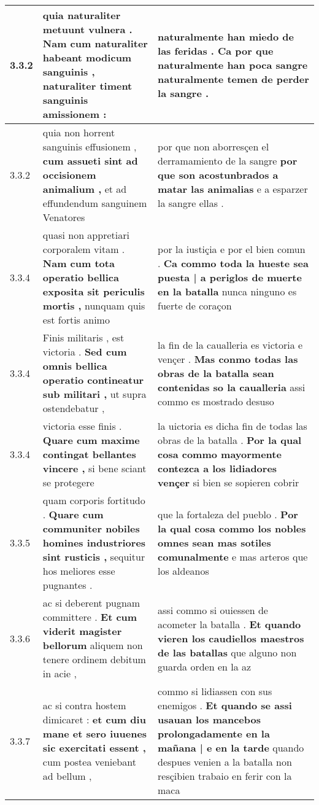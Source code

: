 \begin{tabular}{|p{1cm}|p{6.5cm}|p{6.5cm}|}
3.3.2 & quia naturaliter metuunt vulnera . \textbf{ Nam cum naturaliter habeant modicum sanguinis , } naturaliter timent sanguinis amissionem : & naturalmente han miedo de las feridas . \textbf{ Ca por que naturalmente han poca sangre } naturalmente temen de perder la sangre . \\\hline
3.3.2 & quia non horrent sanguinis effusionem , \textbf{ cum assueti sint ad occisionem animalium , } et ad effundendum sanguinem Venatores & por que non aborresçen el derramamiento de la sangre \textbf{ por que son acostunbrados a matar las animalias } e a esparzer la sangre ellas . \\\hline
3.3.4 & quasi non appretiari corporalem vitam . \textbf{ Nam cum tota operatio bellica exposita sit periculis mortis , } nunquam quis est fortis animo & por la iustiçia e por el bien comun . \textbf{ Ca commo toda la hueste sea puesta | a periglos de muerte en la batalla } nunca ninguno es fuerte de coraçon \\\hline
3.3.4 & Finis militaris , est victoria . \textbf{ Sed cum omnis bellica operatio contineatur sub militari , } ut supra ostendebatur , & la fin de la caualleria es victoria e vençer . \textbf{ Mas conmo todas las obras de la batalla sean contenidas so la caualleria } assi commo es mostrado desuso \\\hline
3.3.4 & victoria esse finis . \textbf{ Quare cum maxime contingat bellantes vincere , } si bene sciant se protegere & la uictoria es dicha fin de todas las obras de la batalla . \textbf{ Por la qual cosa commo mayormente contezca a los lidiadores vençer } si bien se sopieren cobrir \\\hline
3.3.5 & quam corporis fortitudo . \textbf{ Quare cum communiter nobiles homines industriores sint rusticis , } sequitur hos meliores esse pugnantes . & que la fortaleza del pueblo . \textbf{ Por la qual cosa commo los nobles omnes sean mas sotiles comunalmente } e mas arteros que los aldeanos \\\hline
3.3.6 & ac si deberent pugnam committere . \textbf{ Et cum viderit magister bellorum } aliquem non tenere ordinem debitum in acie , & assi commo si ouiessen de acometer la batalla . \textbf{ Et quando vieren los caudiellos maestros de las batallas } que alguno non guarda orden en la az \\\hline
3.3.7 & ac si contra hostem dimicaret : \textbf{ et cum diu mane et sero iuuenes sic exercitati essent , } cum postea veniebant ad bellum , & commo si lidiassen con sus enemigos . \textbf{ Et quando se assi usauan los mancebos prolongadamente en la mañana | e en la tarde } quando despues venien a la batalla non resçibien trabaio en ferir con la maca \\\hline

\end{tabular}
